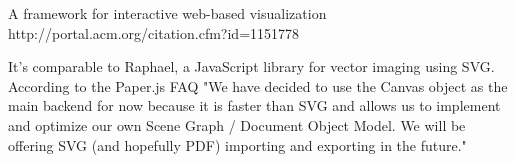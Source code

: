 A framework for interactive web-based visualization
http://portal.acm.org/citation.cfm?id=1151778

It's comparable to Raphael, a JavaScript library for vector imaging using SVG. According to the Paper.js FAQ "We have decided to use the Canvas object as the main backend for now because it is faster than SVG and allows us to implement and optimize our own Scene Graph / Document Object Model. We will be offering SVG (and hopefully PDF) importing and exporting in the future."